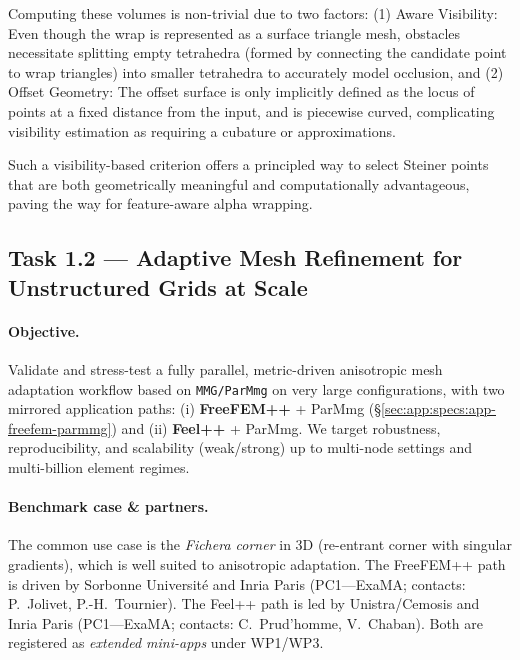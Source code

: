 Computing these volumes is non-trivial due to two factors: (1) Aware Visibility: Even though the wrap is represented as a surface triangle mesh, obstacles necessitate splitting empty tetrahedra (formed by connecting the candidate point to wrap triangles) into smaller tetrahedra to accurately model occlusion, and (2) Offset Geometry: The offset surface is only implicitly defined as the locus of points at a fixed distance from the input, and is piecewise curved, complicating visibility estimation as requiring a cubature or approximations.

Such a visibility-based criterion offers a principled way to select Steiner points that are both geometrically meaningful and computationally advantageous, paving the way for feature-aware alpha wrapping.

\subsection{Task 1.2 — Adaptive Mesh Refinement for Unstructured Grids at Scale}
\label{sec:wp1:t1.2}

\paragraph{Objective.}
Validate and stress-test a fully parallel, metric-driven anisotropic mesh adaptation workflow based on \texttt{MMG/ParMmg} on very large configurations, with two mirrored application paths:
(i) \textbf{FreeFEM++} + ParMmg (\S\ref{sec:app:specs:app-freefem-parmmg}) and
(ii) \textbf{Feel++} + ParMmg.
We target robustness, reproducibility, and scalability (weak/strong) up to multi-node settings and multi-billion element regimes.

\paragraph{Benchmark case \& partners.}
The common use case is the \emph{Fichera corner} in 3D (re-entrant corner with singular gradients), which is well suited to anisotropic adaptation.
The FreeFEM++ path is driven by Sorbonne Université and Inria Paris (PC1—ExaMA; contacts: P.~Jolivet, P.-H.~Tournier).
The Feel++ path is led by Unistra/Cemosis and Inria Paris (PC1—ExaMA; contacts: C.~Prud’homme, V.~Chaban).
Both are registered as \emph{extended mini-apps} under WP1/WP3.

